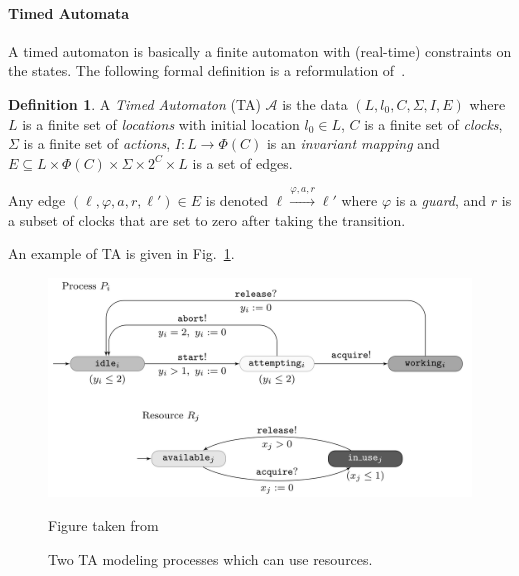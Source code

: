 \documentclass[11pt]{article}
\theoremstyle{definition}
\newtheorem{definition}{Definition}
\theoremstyle{remark}
\theoremstyle{definition}
\begin{document}

\paragraph{Timed Automata}\label{par:ta}
A timed automaton is basically a finite automaton with (real-time) constraints on the states.
The following formal definition is a reformulation of~\cite[Chapter 29.2, Definition 1]{handbook}.
\begin{definition}\label{def:ta}
	A \emph{Timed Automaton} (TA) $\mathcal{A}$ is the data $(L, l_0, C, \Sigma, I, E)$ where
	$L$ is a finite set of \emph{locations} with initial location $l_0 \in L$,
	$C$ is a finite set of \emph{clocks},
	$\Sigma$ is a finite set of \emph{actions},
	$I \colon L \to \Phi(C)$ is an \emph{invariant mapping} and
	$E \subseteq L \times \Phi(C) \times \Sigma \times 2^{C} \times L$ is a set of edges.

	Any edge $(\ell, \varphi, a, r, \ell') \in E$ is denoted $\ell \xrightarrow{\varphi, a, r} \ell'$ where $\varphi$ is a \emph{guard}, and $r$ is a subset of clocks that are set to zero after taking the transition.
\end{definition}
An example of TA is given in Fig.~\ref{fig:ta_ex}.

\begin{figure}[ht]
\centering
\includegraphics[width=.75\textwidth]{../img/TAex.png}
\caption{Two TA modeling processes which can use resources.}\label{fig:ta_ex}
\tiny{Figure taken from \cite[Chapter 29.2]{handbook}}
\end{figure}
\end{document}
